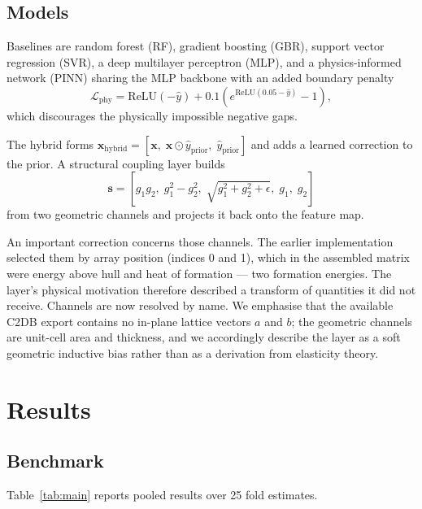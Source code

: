 \documentclass[journal]{IEEEtran}
\begin{document}
\subsection{Models}
Baselines are random forest (RF), gradient boosting (GBR), support vector
regression (SVR), a deep multilayer perceptron (MLP), and a physics-informed
network (PINN) sharing the MLP backbone with an added boundary penalty
\begin{equation}
\mathcal{L}_{\mathrm{phy}} = \mathrm{ReLU}(-\hat{y})
  + 0.1\left(e^{\mathrm{ReLU}(0.05-\hat{y})}-1\right),
\end{equation}
which discourages the physically impossible negative gaps.

The hybrid forms $\mathbf{x}_{\mathrm{hybrid}} = [\mathbf{x},\;
\mathbf{x}\odot\hat{y}_{\mathrm{prior}},\;\hat{y}_{\mathrm{prior}}]$ and adds a
learned correction to the prior. A structural coupling layer builds
\begin{equation}
\mathbf{s} = \left[g_1 g_2,\; g_1^2-g_2^2,\;
  \sqrt{g_1^2+g_2^2+\epsilon},\; g_1,\; g_2\right]
\end{equation}
from two geometric channels and projects it back onto the feature map.

An important correction concerns those channels. The earlier implementation
selected them by array position (indices 0 and 1), which in the assembled matrix
were energy above hull and heat of formation --- two formation energies. The
layer's physical motivation therefore described a transform of quantities it did
not receive. Channels are now resolved by name. We emphasise that the available
C2DB export contains no in-plane lattice vectors $a$ and $b$; the geometric
channels are unit-cell area and thickness, and we accordingly describe the layer
as a soft geometric inductive bias rather than as a derivation from elasticity
theory.

\section{Results}

\subsection{Benchmark}
Table~\ref{tab:main} reports pooled results over 25 fold estimates.
\end{document}
